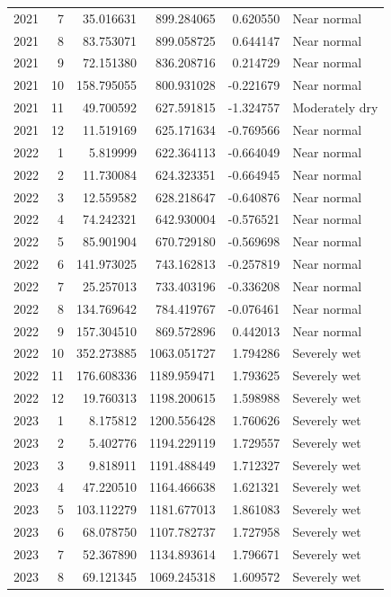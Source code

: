 \begin{tabular}{rrrrrl}
2021 & 7 & 35.016631 & 899.284065 & 0.620550 & Near normal \\
2021 & 8 & 83.753071 & 899.058725 & 0.644147 & Near normal \\
2021 & 9 & 72.151380 & 836.208716 & 0.214729 & Near normal \\
2021 & 10 & 158.795055 & 800.931028 & -0.221679 & Near normal \\
2021 & 11 & 49.700592 & 627.591815 & -1.324757 & Moderately dry \\
2021 & 12 & 11.519169 & 625.171634 & -0.769566 & Near normal \\
2022 & 1 & 5.819999 & 622.364113 & -0.664049 & Near normal \\
2022 & 2 & 11.730084 & 624.323351 & -0.664945 & Near normal \\
2022 & 3 & 12.559582 & 628.218647 & -0.640876 & Near normal \\
2022 & 4 & 74.242321 & 642.930004 & -0.576521 & Near normal \\
2022 & 5 & 85.901904 & 670.729180 & -0.569698 & Near normal \\
2022 & 6 & 141.973025 & 743.162813 & -0.257819 & Near normal \\
2022 & 7 & 25.257013 & 733.403196 & -0.336208 & Near normal \\
2022 & 8 & 134.769642 & 784.419767 & -0.076461 & Near normal \\
2022 & 9 & 157.304510 & 869.572896 & 0.442013 & Near normal \\
2022 & 10 & 352.273885 & 1063.051727 & 1.794286 & Severely wet \\
2022 & 11 & 176.608336 & 1189.959471 & 1.793625 & Severely wet \\
2022 & 12 & 19.760313 & 1198.200615 & 1.598988 & Severely wet \\
2023 & 1 & 8.175812 & 1200.556428 & 1.760626 & Severely wet \\
2023 & 2 & 5.402776 & 1194.229119 & 1.729557 & Severely wet \\
2023 & 3 & 9.818911 & 1191.488449 & 1.712327 & Severely wet \\
2023 & 4 & 47.220510 & 1164.466638 & 1.621321 & Severely wet \\
2023 & 5 & 103.112279 & 1181.677013 & 1.861083 & Severely wet \\
2023 & 6 & 68.078750 & 1107.782737 & 1.727958 & Severely wet \\
2023 & 7 & 52.367890 & 1134.893614 & 1.796671 & Severely wet \\
2023 & 8 & 69.121345 & 1069.245318 & 1.609572 & Severely wet \\

\end{tabular}
